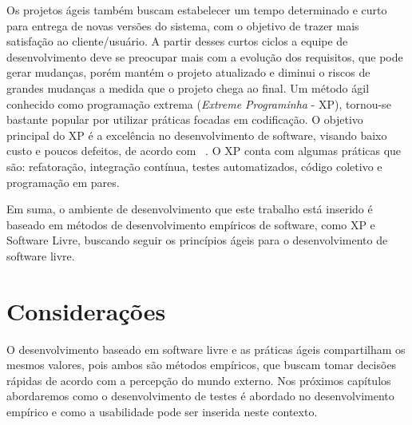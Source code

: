 Os projetos ágeis também buscam estabelecer um tempo determinado e curto para entrega de novas versões do sistema, com o objetivo de trazer mais satisfação ao cliente/usuário.
%
A partir desses curtos ciclos a equipe de desenvolvimento 
deve se preocupar mais com a evolução dos requisitos, que pode gerar mudanças, porém 
mantém o projeto atualizado e diminui o riscos de grandes mudanças a medida que o 
projeto chega ao final.
%
Um método ágil conhecido como programação extrema (\emph{Extreme Programinha} - XP), 
tornou-se bastante popular por utilizar práticas focadas em codificação.
%
O objetivo principal do XP é a excelência no desenvolvimento de software, visando baixo custo e poucos defeitos, de acordo com ~. O XP conta com algumas práticas que são: refatoração, integração contínua, testes automatizados, código coletivo e programação em pares.

Em suma, o ambiente de desenvolvimento que este trabalho está inserido é baseado em métodos de desenvolvimento empíricos de software, como XP e Software Livre, buscando seguir os princípios ágeis para o desenvolvimento de software livre.

\section{Considerações}

O desenvolvimento baseado em software livre e as práticas ágeis compartilham os mesmos valores, pois ambos são métodos empíricos, que buscam tomar decisões rápidas de acordo com a percepção do mundo externo. Nos próximos capítulos abordaremos como o desenvolvimento de testes é abordado no desenvolvimento empírico e como a usabilidade pode ser inserida neste contexto.
